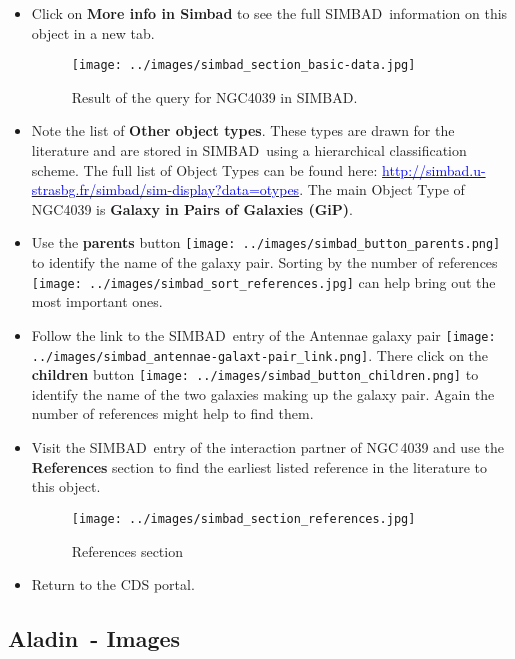 \documentclass [a4paper, 12pt]{article}
\newcommand{\aladin}{{\textsc{A}{ladin}}}
\newcommand{\simbad}{{\textsc{SIMBAD}}}
\begin{document}
\begin{itemize}
    \item Click on \textbf{More info in Simbad} to see the full \simbad\ 
information on this object in a new tab.
\begin{figure}[H]
    \center
    \texttt{[image: ../images/simbad\_section\_basic-data.jpg]}
    \caption{Result of the query for NGC4039 in \simbad.}
    \label{fig:simbad}
\end{figure}
    \item Note the list of \textbf{Other object types}. These types are 
drawn for the literature and are stored in \simbad\ using a 
hierarchical classification scheme. The full list of Object Types can 
be found here: 
\hyperref[http://simbad.u-strasbg.fr/simbad/sim-display?data=otypes]
{\textcolor{blue}{http://simbad.u-strasbg.fr/simbad/sim-display?data=otypes}}.
The main Object Type of NGC4039 is \textbf{Galaxy in Pairs of Galaxies 
(GiP)}.
    \item Use the {\bf parents} button \texttt{[image: ../images/simbad\_button\_parents.png]} to identify the name 
of the galaxy pair. Sorting by the number of references 
\texttt{[image: ../images/simbad\_sort\_references.jpg]} 
can help 
bring out the most important ones. 
    \item Follow the link to the \simbad\ entry of the Antennae galaxy pair 
\texttt{[image: ../images/simbad\_antennae-galaxt-pair\_link.png]}. There 
click on the {\bf children} button \texttt{[image: ../images/simbad\_button\_children.png]} to identify the name 
of the two galaxies making up the galaxy pair. Again the number of references 
might help to find them.  
    \item Visit the \simbad\ entry of the interaction partner of NGC\,4039 and 
use the {\bf References} section to find the earliest listed reference in the 
literature to this object.
\begin{figure}[H]
    \center
    \texttt{[image: ../images/simbad\_section\_references.jpg]}
    \caption{References section}
    \label{fig:simbad}
\end{figure}

    \item Return to the CDS portal.
\end{itemize}




\subsection{\aladin\ - Images}
\end{document}
